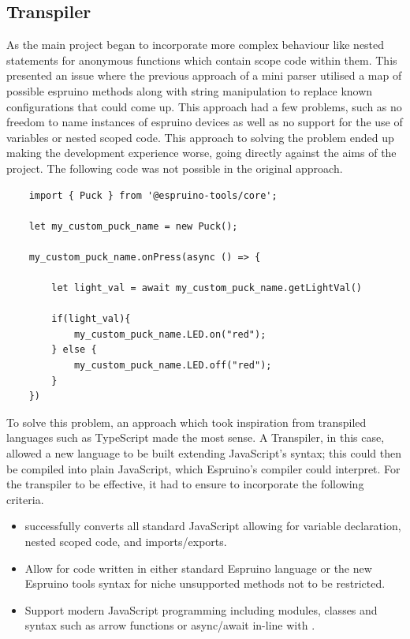 \documentclass{l4proj}
\begin{document}
\subsection{Transpiler}
As the main project began to incorporate more complex behaviour like nested statements for anonymous functions which contain scope code within them. This presented an issue where the previous approach of a mini parser utilised a map of possible espruino methods along with string manipulation to replace known configurations that could come up. This approach had a few problems, such as no freedom to name instances of espruino devices as well as no support for the use of variables or nested scoped code. This approach to solving the problem ended up making the development experience worse, going directly against the aims of the project. The following code was not possible in the original approach.

\begin{lstlisting}
    import { Puck } from '@espruino-tools/core';

    let my_custom_puck_name = new Puck();
    
    my_custom_puck_name.onPress(async () => {
    
        let light_val = await my_custom_puck_name.getLightVal()
        
        if(light_val){
            my_custom_puck_name.LED.on("red");
        } else {
            my_custom_puck_name.LED.off("red");
        }
    })
\end{lstlisting}

To solve this problem, an approach which took inspiration from transpiled languages such as TypeScript made the most sense. A Transpiler, in this case, allowed a new language to be built extending JavaScript's syntax; this could then be compiled into plain JavaScript, which Espruino's compiler could interpret. For the transpiler to be effective, it had to ensure to incorporate the following criteria.
\\
\begin{itemize}
    \item successfully converts all standard JavaScript allowing for variable declaration, nested scoped code, and imports/exports.
    \item Allow for code written in either standard Espruino language or the new Espruino tools syntax for niche unsupported methods not to be restricted.
    \item Support modern JavaScript programming including modules, classes and syntax such as arrow functions or async/await in-line with \cite{kolce2018javascript}.
\end{itemize}
\end{document}
